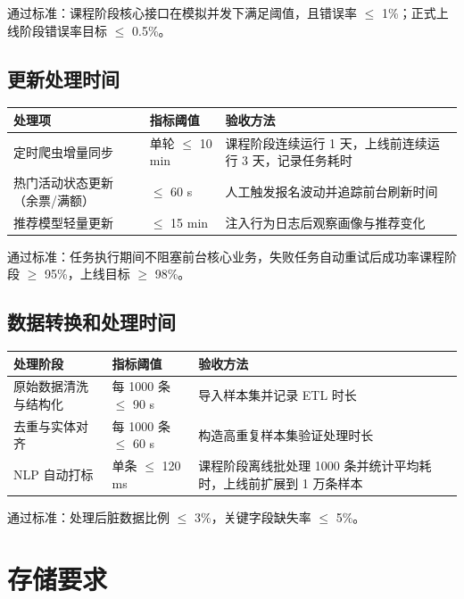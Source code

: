 \documentclass[UTF8,a4paper,12pt,fontset=none]{ctexrep}
\begin{document}
通过标准：课程阶段核心接口在模拟并发下满足阈值，且错误率 $\leq$ 1\%；正式上线阶段错误率目标 $\leq$ 0.5\%。

\subsection{更新处理时间}

\begingroup
\small
\begin{longtable}{|>{\raggedright\arraybackslash}p{}|>{\raggedright\arraybackslash}p{}|>{\raggedright\arraybackslash}p{}|}
\hline
\textbf{处理项} & \textbf{指标阈值} & \textbf{验收方法} \\
\hline
定时爬虫增量同步 & 单轮 $\leq$ 10 min & 课程阶段连续运行 1 天，上线前连续运行 3 天，记录任务耗时 \\
\hline
热门活动状态更新（余票/满额） & $\leq$ 60 s & 人工触发报名波动并追踪前台刷新时间 \\
\hline
推荐模型轻量更新 & $\leq$ 15 min & 注入行为日志后观察画像与推荐变化 \\
\hline
\end{longtable}
\endgroup

通过标准：任务执行期间不阻塞前台核心业务，失败任务自动重试后成功率课程阶段 $\geq$ 95\%，上线目标 $\geq$ 98\%。

\subsection{数据转换和处理时间}

\begingroup
\small
\begin{longtable}{|>{\raggedright\arraybackslash}p{}|>{\raggedright\arraybackslash}p{}|>{\raggedright\arraybackslash}p{}|}
\hline
\textbf{处理阶段} & \textbf{指标阈值} & \textbf{验收方法} \\
\hline
原始数据清洗与结构化 & 每 1000 条 $\leq$ 90 s & 导入样本集并记录 ETL 时长 \\
\hline
去重与实体对齐 & 每 1000 条 $\leq$ 60 s & 构造高重复样本集验证处理时长 \\
\hline
NLP 自动打标 & 单条 $\leq$ 120 ms & 课程阶段离线批处理 1000 条并统计平均耗时，上线前扩展到 1 万条样本 \\
\hline
\end{longtable}
\endgroup

通过标准：处理后脏数据比例 $\leq$ 3\%，关键字段缺失率 $\leq$ 5\%。

\section{存储要求}
\end{document}
